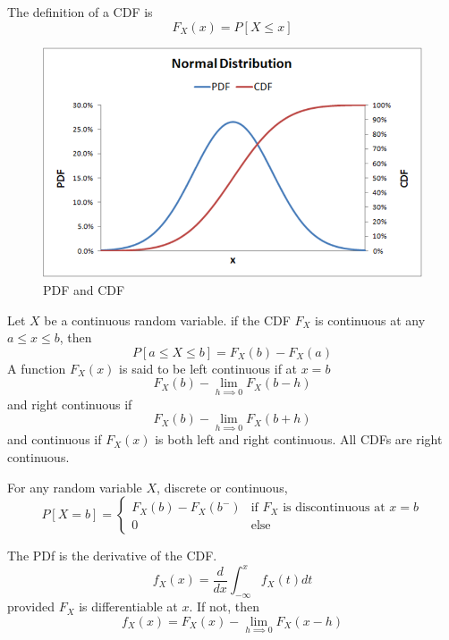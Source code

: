 The definition of a CDF is
\begin{equation}
    F_X(x) = P[X \leq x]
\end{equation}
\begin{figure}
    \centering
    \includegraphics[scale=0.5]{images/normal_distribution_plot.png}
    \caption{PDF and CDF}
\end{figure}
Let $X$ be a continuous random variable. if the CDF
$F_X$ is continuous at any $a\leq x \leq b$, then
\begin{equation}
    P[a \leq X \leq b] = F_X(b) - F_X(a)
\end{equation}
A function $F_X(x)$ is said to be left
continuous if at $x=b$
\begin{equation}
    F_X(b) - \lim_{h\implies 0} F_X(b-h)
\end{equation}
and right continuous if
\begin{equation}
    F_X(b) - \lim_{h\implies 0} F_X(b+h)
\end{equation}
and continuous if $F_X(x)$ is both left
and right continuous.
All CDFs are right continuous.

For any random variable $X$, discrete or continuous,
\begin{equation}
    P[X=b] = \begin{cases}
        F_X(b) - F_X(b^-) & \text{if $F_X$ is discontinuous at $x=b$} \\
        0                 & \text{else}
    \end{cases}
\end{equation}

The PDf is the derivative of the CDF.
\begin{equation}
    f_X(x) = \frac{d}{dx} \int_{-\infty}^{x} f_X(t)dt
\end{equation}
provided $F_X$ is differentiable at $x$. If not, then
\begin{equation}
    f_X(x) = F_X(x) - \lim_{h\implies 0} F_X(x-h)
\end{equation}


